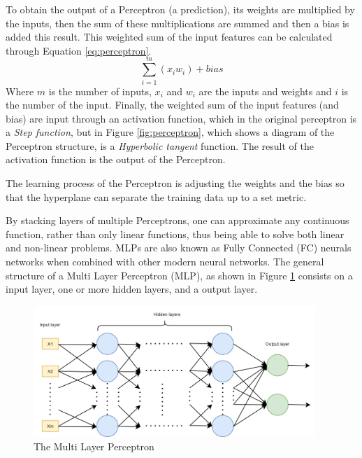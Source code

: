 To obtain the output of a Perceptron (a prediction), its weights are multiplied by the inputs, then the sum of these multiplications are summed and then a bias is added this result. This weighted sum of the input features can be calculated through Equation \ref{eq:perceptron}. 
\begin{equation}\label{eq:perceptron}
\displaystyle\sum_{i=1} ^{m} (x_i w_i)+bias
\end{equation}
Where $m$ is the number of inputs, $x_i$ and $w_i$ are the inputs and weights and $i$ is the number of the input. Finally, the weighted sum of the input features (and bias) are input through an activation function, which in the original perceptron is a \textit{Step function}, but in Figure \ref{fig:perceptron}, which shows a diagram of the Perceptron structure, is a \textit{Hyperbolic tangent} function. The result of the activation function is the output of the Perceptron.

The learning process of the Perceptron is adjusting the weights and the bias so that the hyperplane can separate the training data up to a set metric.

By stacking layers of multiple Perceptrons, one can approximate any continuous function, rather than only linear functions, thus being able to solve both linear and non-linear problems. MLPs are also known as Fully Connected (FC) neurals networks when combined with other modern neural networks.
The general structure of a Multi Layer Perceptron (MLP), as shown in Figure \ref{fig:mlp-structure} consists on a input layer, one or more hidden layers, and a output layer.

\begin{figure}[!ht]
    \centering
    \includegraphics[width=0.95\textwidth]{img/MLP.drawio.png}
    \caption{The Multi Layer Perceptron}
    \label{fig:mlp-structure}
\end{figure}

